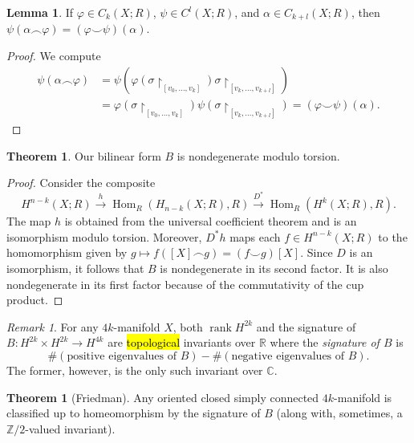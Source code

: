\documentclass[10pt,letterpaper,cm]{nupset}
\theoremstyle{definition}
\theoremstyle{theorem}
\newtheorem{theorem}[definition]{Theorem}
\newtheorem{lemma}[definition]{Lemma}
\theoremstyle{remark}
\newtheorem{remark}[definition]{Remark}
\newcommand{\C}{\mathbb C}
\newcommand{\R}{\mathbb{R}}
\newcommand{\Z}{\mathbb Z}
\newcommand{\1}{\mathbb{1}}
\newcommand{\0}{\vec 0}
\DeclareMathOperator{\rnk}{rank}
\begin{document}
\begin{lemma}
If $\varphi \in C_k(X; R)$, $\psi \in C^l(X; R)$, and $\alpha \in C_{k+l}(X; R)$, then $\psi(\alpha \frown \varphi) = (\varphi \smile \psi)(\alpha)$.
\end{lemma}
\begin{proof}
We compute
\begin{align*}
\psi(\alpha \frown \varphi) & = \psi(\varphi(\sigma \restriction_{\left[v_0, \ldots, v_k\right]})\sigma \restriction_{[v_k, \ldots, v_{k+l}]})
\\  & =  \varphi(\sigma \restriction_{\left[v_0, \ldots, v_k\right]})\psi(\sigma \restriction_{[v_k, \ldots, v_{k+l}]}) =  (\varphi \smile \psi)(\alpha)
.\end{align*}
\end{proof}

\begin{theorem}
Our bilinear form $B$ is nondegenerate modulo torsion.
\end{theorem}
\begin{proof}
Consider the composite $$H^{n-k}(X ; R) \stackrel{h}{\longrightarrow} \operatorname{Hom}_{R}\left(H_{n-k}(X ; R), R\right) \stackrel{D^{*}}{\longrightarrow} \operatorname{Hom}_{R}\left(H^{k}(X ; R), R\right).$$ The map $h$ is obtained from the universal coefficient theorem and is an isomorphism modulo torsion. Moreover, $D^{\ast}{h}$ maps each $f \in H^{n-k}(X;R)$ to the homomorphism given by $g \mapsto f([X] \frown g) = (f\smile g)[X]$. Since $D$ is an isomorphism, it follows that $B$ is nondegenerate in its second factor. It is also nondegenerate in its first factor because of the commutativity of the cup product. 
\end{proof}


\begin{remark}
For any $4k$-manifold $X$, both $\rnk{H^{2k}}$ and the signature of $B : H^{2k} \times H^{2k} \to H^{4k}$ are \hl{topological} invariants over $\R$ where the \textit{signature of $B$} is $$\#\left(\text{positive eigenvalues of }B\right) - \#\left(\text{negative eigenvalues of }B\right).$$ The former, however, is the only such invariant over $\C$.
\end{remark}

\begin{theorem}[Friedman]
Any oriented closed simply connected $4k$-manifold is classified up to homeomorphism by the signature of $B$ (along with, sometimes, a $\Z/2$-valued invariant).
\end{theorem}
\end{document}
